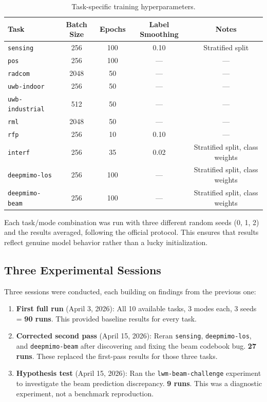 \documentclass[11pt]{article}
\newcommand{\code}[1]{\texttt{#1}}
\begin{document}
\begin{table}[H]
\centering
\caption{Task-specific training hyperparameters.}
\label{tab:hyperparams}
\small
\begin{tabular}{lcccc}
\toprule
\textbf{Task} & \textbf{Batch Size} & \textbf{Epochs} & \textbf{Label Smoothing} & \textbf{Notes} \\
\midrule
\code{sensing}            & 256  & 100 & 0.10 & Stratified split \\
\code{pos}                & 256  & 100 & ---  & --- \\
\code{radcom}             & 2048 & 50  & ---  & --- \\
\code{uwb-indoor}         & 256  & 50  & ---  & --- \\
\code{uwb-industrial}     & 512  & 50  & ---  & --- \\
\code{rml}                & 2048 & 50  & ---  & --- \\
\code{rfp}                & 256  & 10  & 0.10 & --- \\
\code{interf}             & 256  & 35  & 0.02 & Stratified split, class weights \\
\code{deepmimo-los}       & 256  & 100 & ---  & Stratified split, class weights \\
\code{deepmimo-beam}      & 256  & 100 & ---  & Stratified split, class weights \\
\bottomrule
\end{tabular}
\end{table}

Each task/mode combination was run with three different random seeds (0, 1, 2) and the results averaged, following the official protocol. This ensures that results reflect genuine model behavior rather than a lucky initialization.

\subsection{Three Experimental Sessions}

Three sessions were conducted, each building on findings from the previous one:

\begin{enumerate}
    \item \textbf{First full run} (April 3, 2026): All 10 available tasks, 3 modes each, 3 seeds = \textbf{90 runs}. This provided baseline results for every task.

    \item \textbf{Corrected second pass} (April 15, 2026): Reran \code{sensing}, \code{deepmimo-los}, and \code{deepmimo-beam} after discovering and fixing the beam codebook bug. \textbf{27 runs}. These replaced the first-pass results for those three tasks.

    \item \textbf{Hypothesis test} (April 15, 2026): Ran the \code{lwm-beam-challenge} experiment to investigate the beam prediction discrepancy. \textbf{9 runs}. This was a diagnostic experiment, not a benchmark reproduction.
\end{enumerate}
\end{document}
